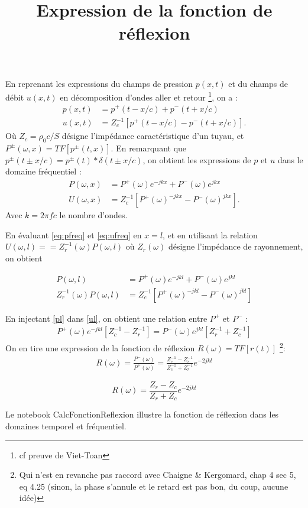 \documentclass{article}
\title{Expression de la fonction de réflexion }
\author{}
\date{}
\newcommand{\powinv}{^{-1}}
\begin{document}
\maketitle

En reprenant les expressions du champs de pression $p(x, t)$ et du champs de débit $u(x, t)$ en décomposition d'ondes aller et retour \footnote{cf preuve de Viet-Toan}, on a :
\begin{align}
p(x, t) & = p^+(t-x/c)+p^-(t+x/c)\\
u(x,t) & = Z_c^{-1}[p^+(t-x/c)-p^-(t+x/c)].
\end{align}
Où $Z_c=\rho_0c/S$ désigne l'impédance caractéristique d'un tuyau, et $P^{\pm}(\omega, x)=TF[p^{\pm}(t, x)]$. En remarquant que $p^{\pm}(t\pm x/c)=p^{\pm}(t)\ast\delta(t\pm x/c)$, on obtient les expressions de $p$ et $u$ dans le domaine fréquentiel :
\begin{align}
P(\omega, x) & =P^+(\omega)e^{-jkx}+P^-(\omega)e^{jkx} \label{eq:pfreq}\\ 
U(\omega, x) & = Z_c^{-1}\left[P^+(\omega)^{-jkx}-P^-(\omega)^{jkx}\right]\label{eq:ufreq}.
\end{align}
Avec $k=2\pi fc$ le nombre d'ondes.\par

En évaluant \ref{eq:pfreq} et \ref{eq:ufreq} en $x=l$, et en utilisant la relation $U(\omega, l)==Z_r\powinv(\omega)P(\omega, l)$ où $Z_r(\omega)$ désigne l'impédance de rayonnement, on obtient

\begin{align}
P(\omega, l) & =P^+(\omega)e^{-jkl}+P^-(\omega)e^{jkl}\label{pl}\\ 
Z_r\powinv(\omega)P(\omega, l) & = Z_c^{-1}\left[P^+(\omega)^{-jkl}-P^-(\omega)^{jkl}\right]\label{ul}
\end{align}

En injectant \ref{pl} dans \ref{ul}, on obtient une relation entre $P^+$ et $P^-$ :
\begin{align}
P^+(\omega)e^{-jkl}\left[Z_c\powinv-Z_r\powinv\right]=P^-(\omega)e^{jkl}\left[Z_r\powinv+Z_c\powinv\right]
\end{align}
On en tire une expression de la fonction de réflexion $R(\omega)=TF[r(t)]$ \footnote{Qui n'est en revanche pas raccord avec Chaigne \& Kergomard, chap 4 sec 5, eq 4.25 (sinon, la phase s'annule et le retard est pas bon, du coup, aucune idée)}:
\begin{align}
R(\omega) =\frac{P^-(\omega)}{P^+(\omega)}=\frac{Z_c\powinv-Z_r\powinv}{Z_c\powinv+Z_r\powinv} e^{-2jkl}
\end{align}

\begin{equation}
	\boxed{R(\omega) = \frac{Z_r-Z_c}{Z_r+Z_c} e^{-2jkl}}
\end{equation}

Le notebook CalcFonctionReflexion illustre la fonction de réflexion dans les domaines temporel et fréquentiel.
\end{document}
